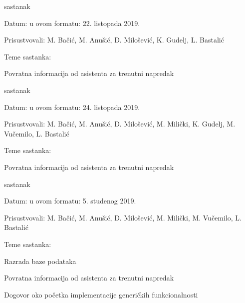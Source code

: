 \begin{packed_enum}
			\item  sastanak
			\item[] \begin{packed_item}
				\item Datum: u ovom formatu: 22. listopada 2019.
				\item Prisustvovali: M. Bačić, M. Anušić, D. Milošević, K. Gudelj, L. Bastalić
				\item Teme sastanka:
				\begin{packed_item}
					\item  Povratna informacija od asistenta za trenutni napredak
				\end{packed_item}
			\end{packed_item}
		
			\item  sastanak
			\item[] \begin{packed_item}
				\item Datum: u ovom formatu: 24. listopada 2019.
				\item Prisustvovali:  M. Bačić, M. Anušić, D. Milošević, M. Milički, K. Gudelj, M. Vučemilo, L. Bastalić
				\item Teme sastanka:
				\begin{packed_item}
					\item  Povratna informacija od asistenta za trenutni napredak
				\end{packed_item}
			\end{packed_item}
		
			\item  sastanak
			\item[] \begin{packed_item}
				\item Datum: u ovom formatu: 5. studenog 2019.
				\item Prisustvovali:  M. Bačić, M. Anušić, D. Milošević, M. Milički, M. Vučemilo, L. Bastalić
				\item Teme sastanka:
				\begin{packed_item}
					\item  Razrada baze podataka
					\item  Povratna informacija od asistenta za trenutni napredak
					\item  Dogovor oko početka implementacije generičkih funkcionalnosti
				\end{packed_item}
			\end{packed_item}
		

\end{packed_enum}
